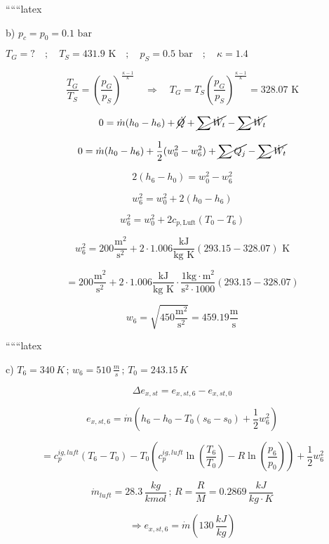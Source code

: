 ``````latex


b) $p_c = p_0 = 0.1 \text{ bar}$

$T_G = ? \quad ; \quad T_S = 431.9 \text{ K} \quad ; \quad p_S = 0.5 \text{ bar} \quad ; \quad \kappa = 1.4$


\[
\frac{T_G}{T_S} = \left( \frac{p_G}{p_S} \right)^{\frac{\kappa - 1}{\kappa}} \quad \Rightarrow \quad T_G = T_S \left( \frac{p_G}{p_S} \right)^{\frac{\kappa - 1}{\kappa}} = 328.07 \text{ K}
\]


\[
0 = \dot{m} (h_0 - h_6) + \cancel{\dot{Q}} + \cancel{\sum \dot{W}_t} - \cancel{\sum \dot{W}_t}
\]

\[
0 = \dot{m} (h_0 - h_6) + \frac{1}{2} (w_0^2 - w_6^2) + \cancel{\sum Q_j} - \cancel{\sum \dot{W}_t}
\]

 \rightarrow {}

\[
2(h_6 - h_0) = w_0^2 - w_6^2
\]

\[
w_6^2 = w_0^2 + 2(h_0 - h_6)
\]

\[
w_6^2 = w_0^2 + 2 c_{p,\text{Luft}} (T_0 - T_6)
\]

\[
w_6^2 = 200 \frac{\text{m}^2}{\text{s}^2} + 2 \cdot 1.006 \frac{\text{kJ}}{\text{kg K}} (293.15 - 328.07) \text{ K}
\]

\[
= 200 \frac{\text{m}^2}{\text{s}^2} + 2 \cdot 1.006 \frac{\text{kJ}}{\text{kg K}} \cdot \frac{1 \text{kg} \cdot \text{m}^2}{\text{s}^2 \cdot 1000} (293.15 - 328.07)
\]

\[
w_6 = \sqrt{450 \frac{\text{m}^2}{\text{s}^2}} = 459.19 \frac{\text{m}}{\text{s}}
\]

``````latex


c) $T_6 = 340 \, K \, ; \, w_6 = 510 \, \frac{m}{s} \, ; \, T_0 = 243.15 \, K$

\[
\Delta e_{x,st} = e_{x,st,6} - e_{x,st,0}
\]

\[
e_{x,st,6} = \dot{m} \left( h_6 - h_0 - T_0 (s_6 - s_0) + \frac{1}{2} w_6^2 \right)
\]

\[
= c_p^{ig,luft} (T_6 - T_0) - T_0 \left( c_p^{ig,luft} \ln \left( \frac{T_6}{T_0} \right) - R \ln \left( \frac{p_6}{p_0} \right) \right) + \frac{1}{2} w_6^2
\]

\[
\dot{m}_{luft} = 28.3 \, \frac{kg}{kmol} \, ; \, R = \frac{R}{M} = 0.2869 \, \frac{kJ}{kg \cdot K}
\]

\[
\Rightarrow e_{x,st,6} = \dot{m} \left( 130 \, \frac{kJ}{kg} \right)
\]

